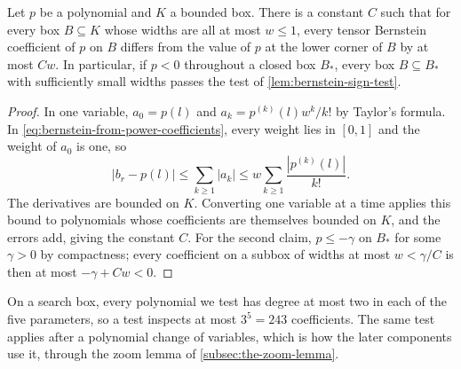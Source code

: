 \begin{lemma}\label{lem:convergence-of-bernstein-coefficients}
  Let $p$ be a polynomial and $K$ a bounded box. There is a constant $C$
  such that for every box $B\subseteq K$ whose widths are all at most
  $w\le1$, every tensor Bernstein coefficient of $p$ on $B$ differs from
  the value of $p$ at the lower corner of $B$ by at most $Cw$. In
  particular, if $p<0$ throughout a closed box $B_*$, every box
  $B\subseteq B_*$ with sufficiently small widths passes the test of
  \cref{lem:bernstein-sign-test}.
\end{lemma}
\begin{proof}
  In one variable, $a_0=p(l)$ and $a_k=p^{(k)}(l)w^k/k!$ by Taylor's
  formula. In \cref{eq:bernstein-from-power-coefficients}, every weight
  lies in $[0,1]$ and the weight of $a_0$ is one, so
  \[
    |b_r-p(l)|\le\sum_{k\ge1}|a_k|
      \le w\sum_{k\ge1}\frac{|p^{(k)}(l)|}{k!}.
  \]
  The derivatives are bounded on $K$. Converting one variable at a time
  applies this bound to polynomials whose coefficients are themselves
  bounded on $K$, and the errors add, giving the constant $C$. For the
  second claim, $p\le-\gamma$ on $B_*$ for some $\gamma>0$ by compactness;
  every coefficient on a subbox of widths at most $w<\gamma/C$ is then at
  most $-\gamma+Cw<0$.
\end{proof}

On a search box, every polynomial we test has degree at most two in each
of the five parameters, so a test inspects at most $3^5=243$ coefficients.
The same test applies after a polynomial change of variables, which is how
the later components use it, through the zoom lemma of
\cref{subsec:the-zoom-lemma}.
